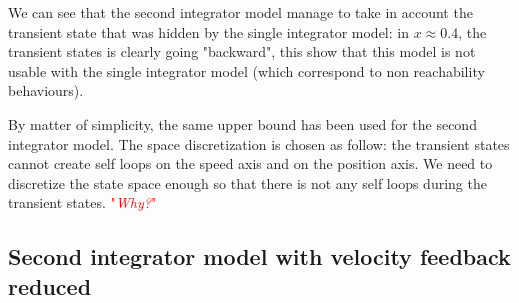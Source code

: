 \documentclass{article}
\theoremstyle{named}
\newcommand\comment[1]{\textcolor{red}{"\textit{#1}"}}
\begin{document}
We can see that the second integrator model manage to take in account the transient state that was hidden by the single integrator model: in $x\approx0.4$, the transient states is clearly going "backward", this show that this model is not usable with the single integrator model (which correspond to non reachability behaviours).

By matter of simplicity, the same upper bound has been used for the second integrator model.
The space discretization is chosen as follow:
the transient states cannot create self loops on the speed axis and on the position axis.
We need to discretize the state space enough so that there is not any self loops during the transient states. \comment{Why?}

\subsection{Second integrator model with velocity feedback reduced}
\end{document}
